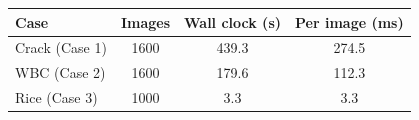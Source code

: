 \begin{tabular}{@{}lccc@{}}
\toprule
Case & Images & Wall clock (s) & Per image (ms) \\
\midrule
Crack (Case 1) & 1600 & 439.3 & 274.5 \\
WBC (Case 2) & 1600 & 179.6 & 112.3 \\
Rice (Case 3) & 1000 & 3.3 & 3.3 \\
\bottomrule
\end{tabular}
